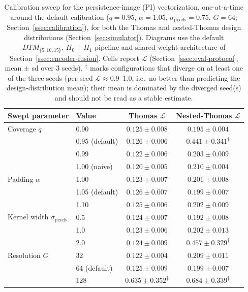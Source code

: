 \documentclass[11pt,letterpaper]{article}
\newcommand{\1}{\mathds{1}}
\theoremstyle{plain}
\theoremstyle{definitioncolon}
\begin{document}
\begin{table}[tbp]
\centering
\small
\begin{tabular}{llcc}
\toprule
Swept parameter & Value & Thomas $\mathcal{L}$ & Nested-Thomas $\mathcal{L}$ \\
\midrule
Coverage $q$
  & 0.90            & $0.125 \pm 0.008$ & $0.195 \pm 0.004$ \\
  & 0.95 (default)  & $0.126 \pm 0.006$ & $0.441 \pm 0.341^\dagger$ \\
  & 0.99            & $0.122 \pm 0.006$ & $0.203 \pm 0.009$ \\
  & 1.00 (naive)    & $0.120 \pm 0.005$ & $0.210 \pm 0.004$ \\
\addlinespace
Padding $\alpha$
  & 1.00            & $0.123 \pm 0.007$ & $0.201 \pm 0.008$ \\
  & 1.05 (default)  & $0.126 \pm 0.007$ & $0.199 \pm 0.007$ \\
  & 1.10            & $0.125 \pm 0.006$ & $0.202 \pm 0.009$ \\
\addlinespace
Kernel width $\sigma_{\text{pixels}}$
  & 0.5             & $0.124 \pm 0.007$ & $0.192 \pm 0.008$ \\
  & 1.0             & $0.123 \pm 0.006$ & $0.202 \pm 0.013$ \\
  & 2.0             & $0.124 \pm 0.009$ & $0.457 \pm 0.329^\dagger$ \\
\addlinespace
Resolution $G$
  & 32              & $0.122 \pm 0.004$ & $0.209 \pm 0.011$ \\
  & 64 (default)    & $0.125 \pm 0.009$ & $0.199 \pm 0.007$ \\
  & 128             & $0.635 \pm 0.352^\dagger$ & $0.684 \pm 0.339^\dagger$ \\
\bottomrule
\end{tabular}
\caption{Calibration sweep for the persistence-image (PI) vectorization,
one-at-a-time around the default calibration ($q=0.95$, $\alpha=1.05$,
$\sigma_{\text{pixels}}=0.75$, $G=64$; Section~\ref{ssec:calibration}), for
both the Thomas and nested-Thomas design distributions
(Section~\ref{sec:simulator}). Diagrams use the default $DTM_{\{5,10,15\}}$,
$H_0{+}H_1$ pipeline and shared-weight architecture of
Section~\ref{ssec:encoder-fusion}. Cells report $\mathcal{L}$
(Section~\ref{ssec:eval-protocol}, mean $\pm$ sd over 3 seeds).
$^\dagger$ marks configurations that diverge on at least one of the
three seeds (per-seed $\mathcal{L} \approx 0.9$--$1.0$, i.e.\ no better than
predicting the design-distribution mean); their mean is dominated by the
diverged seed(s) and should not be read as a stable estimate.}
\label{tab:calibration-sweep}
\end{table}
\end{document}
